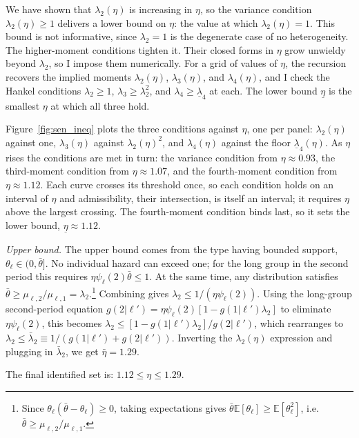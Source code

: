 \documentclass{div}
\begin{document}
We have shown that $\lambda_2(\eta)$ is increasing in $\eta$, so the variance condition $\lambda_2(\eta)\ge1$ delivers a lower bound on $\eta$: the value at which $\lambda_2(\eta)=1$. This bound is not informative, since $\lambda_2=1$ is the degenerate case of no heterogeneity. The higher-moment conditions tighten it. Their closed forms in $\eta$ grow unwieldy beyond $\lambda_2$, so I impose them numerically. For a grid of values of $\eta$, the recursion recovers the implied moments $\lambda_2(\eta)$, $\lambda_3(\eta)$, and $\lambda_4(\eta)$, and I check the Hankel conditions $\lambda_2\ge1$, $\lambda_3\ge\lambda_2^2$, and $\lambda_4\ge\underline{\lambda}_4$ at each. The lower bound $\underline{\eta}$ is the smallest $\eta$ at which all three hold.

Figure~\ref{fig:sen_ineq} plots the three conditions against $\eta$, one per panel: $\lambda_2(\eta)$ against one, $\lambda_3(\eta)$ against $\lambda_2(\eta)^2$, and $\lambda_4(\eta)$ against the floor $\underline{\lambda}_4(\eta)$. As $\eta$ rises the conditions are met in turn: the variance condition from $\eta\approx0.93$, the third-moment condition from $\eta\approx1.07$, and the fourth-moment condition from $\eta\approx1.12$. Each curve crosses its threshold once, so each condition holds on an interval of $\eta$ and admissibility, their intersection, is itself an interval; it requires $\eta$ above the largest crossing. The fourth-moment condition binds last, so it sets the lower bound, $\underline{\eta}\approx1.12$.

\textit{Upper bound.} The upper bound comes from the type having bounded support, $\theta_\ell\in(0,\bar\theta]$. No individual hazard can exceed one; for the long group in the second period this requires $\eta\psi_\ell(2)\bar\theta\le1$. At the same time, any distribution satisfies $\bar\theta\ge\mu_{\ell,2}/\mu_{\ell,1}=\lambda_2$.\footnote{Since $\theta_\ell(\bar\theta-\theta_\ell)\ge0$, taking expectations gives $\bar\theta\mathbb{E}[\theta_\ell]\ge\mathbb{E}[\theta_\ell^2]$, i.e.\ $\bar\theta\ge\mu_{\ell,2}/\mu_{\ell,1}$.} Combining gives $\lambda_2\le 1/(\eta\psi_\ell(2))$. Using the long-group second-period equation $g(2|\ell')=\eta\psi_\ell(2)[1-g(1|\ell')\lambda_2]$ to eliminate $\eta\psi_\ell(2)$, this becomes $\lambda_2\le [1-g(1|\ell')\lambda_2]/g(2|\ell')$, which rearranges to $\lambda_2\le \bar{\lambda}_2 \equiv 1/(g(1|\ell')+g(2|\ell'))$. Inverting the $\lambda_2(\eta)$ expression and plugging in $ \bar{\lambda}_2 $, we get $\bar{\eta}=1.29$. 

The final identified set is: $ 1.12 \leq \eta \leq 1.29  $.
\end{document}
